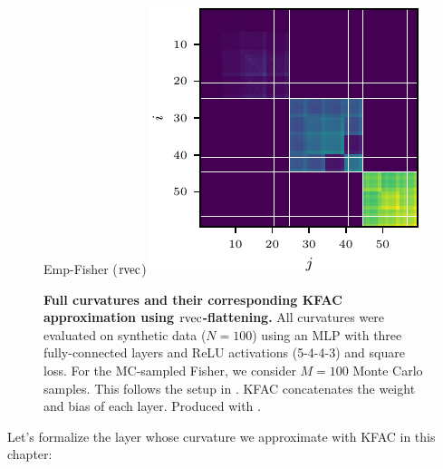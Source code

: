 \begin{figure}[!h]
\begin{minipage}[t]{0.485\linewidth}
  \end{minipage}
  \hfill
  \begin{minipage}[t]{0.485\linewidth}
    \centering
    Emp-Fisher ($\operatorname{rvec}$)\vspace{1ex}
    \includegraphics[width=\linewidth]{../kfs/plots/synthetic_rvec_empfisher_kfac.pdf}
  \end{minipage}
  \caption{\textbf{Full curvatures and their corresponding KFAC approximation using $\operatorname{rvec}$-flattening.}
    All curvatures were evaluated on synthetic data ($N = 100$) using an MLP with three fully-connected layers and ReLU activations (5-4-4-3) and square loss.
    For the MC-sampled Fisher, we consider $M = 100$ Monte Carlo samples.
    This follows the setup in .
    KFAC concatenates the weight and bias of each layer.
    Produced with .}
  \label{fig:rvec-kfac-full-comparison}
\end{figure}

\switchcolumn[0]

Let's formalize the layer whose curvature we approximate with KFAC in this chapter:

